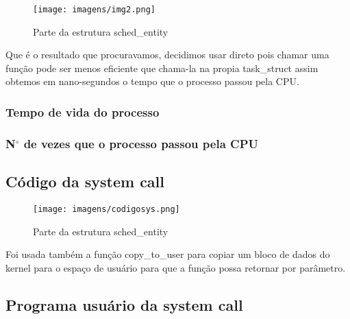 \documentclass[12pt]{article}
\begin{document}
\begin{figure}[!h]
	\centering
	\texttt{[image: imagens/img2.png]}
	\caption{Parte da estrutura sched\_entity}
	\label{schedentity}
\end{figure}

	Que é o resultado que procuravamos, decidimos usar direto pois chamar uma função pode ser menos eficiente que chama-la na propia task\_struct assim obtemos em nano-segundos o tempo que o processo passou pela CPU.


\subsubsection*{Tempo de vida do processo}
\subsubsection*{N$^{\circ}$  de vezes que o processo passou pela CPU}
\subsection*{Código da system call}

\begin{figure}[!h]
	\centering
\texttt{[image: imagens/codigosys.png]} 
	\caption{Parte da estrutura sched\_entity}
	\label{codigosystem}
\end{figure}

Foi usada também a função copy\_to\_user para copiar um bloco de dados do kernel para o espaço de usuário para que a função possa retornar por parâmetro.

\subsection*{Programa usuário da system call}






\end{document}
